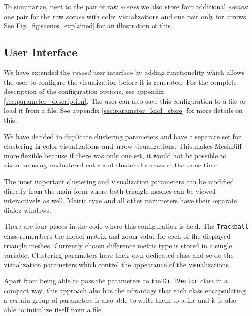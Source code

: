 To summarize, next to the pair of raw {\it scenes} we also store four additional {\it scenes}: one pair for the raw {\it scenes} with color visualizations and one pair only for arrows. See Fig. \ref{fig:scenes_explained} for an illustration of this.

\subsection{User Interface}
\label{implemetation-user_interface}

We have extended the {\it reused} user interface by adding functionality which allows the user to configure the visualization before it is generated. For the complete description of the configuration options, see appendix \ref{sec:parameter_description}. The user can also save this configuration to a file or load it from a file. See appendix \ref{sec:parameter_load_store} for more details on this.

We have decided to duplicate clustering parameters and have a separate set for clustering in color visualizations and arrow visualizations. This makes MeshDiff more flexible because if there was only one set, it would not be possible to visualize using unclustered color and clustered arrows at the same time.

The most important clustering and visualization parameters can be modified directly from the main form where both triangle meshes can be viewed interactively as well. Metric type and all other parameters have their separate dialog windows.

There are four places in the code where this configuration is held. The \verb+Trackball+ class remembers the model matrix and zoom value for each of the displayed triangle meshes. Currently chosen difference metric type is stored in a single variable. Clustering parameters have their own dedicated class and so do the visualization parameters which control the appearance of the visualizations.

Apart from being able to pass the parameters to the \verb+DiffVector+ class in a compact way, this approach also has the advantage that each class encapsulating a certain group of parameters is also able to write them to a file and it is also able to initialize itself from a file\footnotemark.


